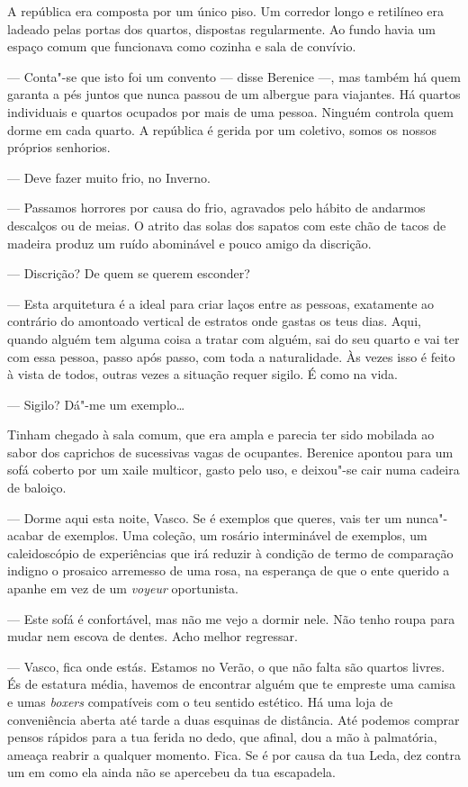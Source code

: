A república era composta por um único piso. Um corredor longo e
retilíneo era ladeado pelas portas dos quartos, dispostas regularmente.
Ao fundo havia um espaço comum que funcionava como cozinha e sala de
convívio.

--- Conta"-se que isto foi um convento --- disse Berenice
---, mas também há quem garanta a pés juntos que nunca passou de um
albergue para viajantes. Há quartos individuais e quartos ocupados por
mais de uma pessoa. Ninguém controla quem dorme em cada quarto. A
república é gerida por um coletivo, somos os nossos próprios senhorios.

--- Deve fazer muito frio, no Inverno.

--- Passamos horrores por causa do frio, agravados pelo hábito de andarmos
  descalços ou de meias. O atrito das solas dos sapatos com este chão de
  tacos de madeira produz um ruído abominável e pouco amigo da
  discrição.

--- Discrição? De quem se querem esconder?

--- Esta arquitetura é a ideal para criar laços entre as pessoas,
  exatamente ao contrário do amontoado vertical de estratos onde gastas
  os teus dias. Aqui, quando alguém tem alguma coisa a tratar com
  alguém, sai do seu quarto e vai ter com essa pessoa, passo após passo,
  com toda a naturalidade. Às vezes isso é feito à vista de todos,
  outras vezes a situação requer sigilo. É como na vida.

--- Sigilo? Dá"-me um exemplo\ldots{}

Tinham chegado à sala comum, que era ampla e parecia ter sido mobilada
ao sabor dos caprichos de sucessivas vagas de ocupantes. Berenice
apontou para um sofá coberto por um xaile multicor, gasto pelo uso, e
deixou"-se cair numa cadeira de baloiço.

--- Dorme aqui esta noite, Vasco. Se é exemplos que queres, vais ter um
  nunca"-acabar de exemplos. Uma coleção, um rosário interminável de
  exemplos, um caleidoscópio de experiências que irá reduzir à
  condição de termo de comparação indigno o prosaico arremesso de uma
  rosa, na esperança de que o ente querido a apanhe em vez de um
  \emph{voyeur }oportunista.

--- Este sofá é confortável, mas não me vejo a dormir nele. Não tenho
  roupa para mudar nem escova de dentes. Acho melhor regressar.

--- Vasco, fica onde estás. Estamos no Verão, o que não falta são quartos
  livres. És de estatura média, havemos de encontrar alguém que te
  empreste uma camisa e umas \emph{boxers }compatíveis com o teu sentido
  estético. Há uma loja de conveniência aberta até tarde a duas
  esquinas de distância. Até podemos comprar pensos rápidos para a tua
  ferida no dedo, que afinal, dou a mão à palmatória, ameaça reabrir a
  qualquer momento. Fica. Se é por causa da tua Leda, dez contra um em
  como ela ainda não se apercebeu da tua escapadela.

